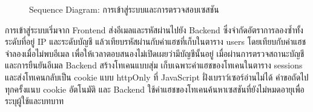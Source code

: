 \begin{figure}[H]
\centering
{}
\caption{Sequence Diagram: การเข้าสู่ระบบและการตรวจสอบเซสชัน}
\label{fig:sequence_login}
\end{figure}

การเข้าสู่ระบบเริ่มจาก Frontend ส่งอีเมลและรหัสผ่านไปยัง Backend ซึ่งจำกัดอัตราการลองซ้ำทั้งระดับที่อยู่ IP และระดับบัญชี แล้วเทียบรหัสผ่านกับค่าแฮชที่เก็บในตาราง users โดยเทียบกับค่าแฮชจำลองเมื่อไม่พบอีเมล เพื่อให้เวลาตอบสนองไม่เปิดเผยว่ามีบัญชีนั้นอยู่ เมื่อผ่านการตรวจสถานะบัญชีและการยืนยันอีเมล Backend สร้างโทเคนแบบสุ่ม เก็บเฉพาะค่าแฮชของโทเคนในตาราง sessions และส่งโทเคนกลับเป็น cookie แบบ httpOnly ที่ JavaScript ฝั่งเบราว์เซอร์อ่านไม่ได้ คำขอถัดไปทุกครั้งแนบ cookie อัตโนมัติ และ Backend ใช้ค่าแฮชของโทเคนค้นหาเซสชันที่ยังไม่หมดอายุเพื่อระบุผู้ใช้และบทบาท

